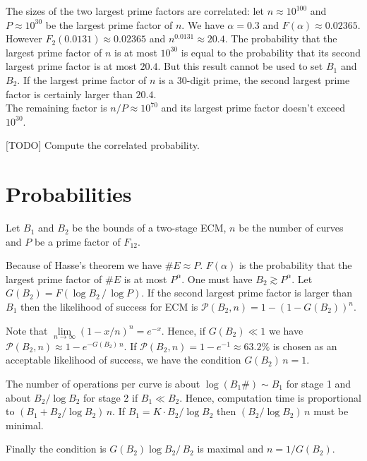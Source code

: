 \documentclass[a4paper, 11pt, pdftex]{report}
\theoremstyle{plain}
\theoremstyle{definition}
\begin{document}
\newpage

The sizes of the two largest prime factors are correlated: let $n \approx 10^{100}$
and $P \approx 10^{30}$ be the largest prime factor of $n$. We have $\alpha = 0.3$
and $F(\alpha) \approx 0.02365$. However $F_2(0.0131) \approx 0.02365$ and
$n^{0.0131} \approx 20.4$.
The probability that the largest prime factor of $n$ is at most $10^{30}$ is equal to
the probability that its second largest prime factor is at most $20.4$. But this result
cannot be used to set $B_1$ and $B_2$. If the largest prime factor of $n$ is a 30-digit
prime, the second largest prime factor is certainly larger than $20.4$.\\
The remaining factor is $n / P \approx 10^{70}$ and its largest prime factor doesn't
exceed $10^{30}$.

$[$TODO$]$ Compute the correlated probability.

\section{Probabilities}

Let $B_1$ and $B_2$ be the bounds of a two-stage ECM, $n$ be the number of curves and $P$
be a prime factor of $F_{12}$.

Because of Hasse's theorem we have $\#E \approx P$. $F(\alpha)$ is the probability that
the largest prime factor of $\#E$ is at most $P^\alpha$. One must have $B_2 \gtrsim P^\alpha$.
Let $G(B_2) = F(\log B_2\, /\, \log P)$. If the second largest prime factor is larger than $B_1$
then the likelihood of success for ECM is $\mathcal{P}(B_2, n) = 1 - \left(1 - G(B_2) \right)^n$.

Note that $\lim\limits_{n \to \infty} \left(1 - x/n \right)^n = e^{-x}$. Hence, if
$G(B_2) \ll 1$ we have $\mathcal{P}(B_2, n) \approx 1 - e^{-G(B_2)\, n}$.
If $\mathcal{P}(B_2, n) = 1 - e^{-1} \approx 63.2\%$ is chosen as an acceptable
likelihood of success, we have the condition $G(B_2)\, n = 1.$

The number of operations per curve is about $\log(B_1\#) \sim B_1$ for stage 1 and about
$B_2 / \log B_2$ for stage 2 if $B_1 \ll B_2$. Hence, computation time is proportional to
$\left(B_1 + B_2 / \log B_2 \right)\, n$. If $B_1 = K \cdot B_2 / \log B_2$ then
$\left(B_2 / \log B_2 \right)\, n$ must be minimal.

Finally the condition is $G(B_2) \log B_2 /\, B_2$ is maximal and $n = 1 / G(B_2)$.
\end{document}
